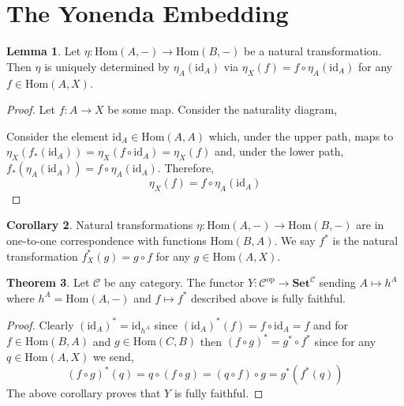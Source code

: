 \documentclass[12pt]{article}
\newcommand{\id}{\mathrm{id}}
\newcommand{\Hom}[2]{\mathrm{Hom}\left(#1, #2 \right)}
\newcommand{\C}{\mathcal{C}}
\newcommand{\Set}{\mathbf{Set}}
\newcommand{\op}{\mathrm{op}}
\theoremstyle{remark}
\theoremstyle{definition}
\newtheorem{theorem}{Theorem}[section]
\newtheorem{lemma}[theorem]{Lemma}
\newtheorem{corollary}[theorem]{Corollary}
\begin{document}
\section{The Yonenda Embedding}

\begin{lemma}
Let $\eta : \Hom{A}{-} \to \Hom{B}{-}$ be a natural transformation. Then $\eta$ is uniquely determined by $\eta_A(\id_A)$ via $\eta_X(f) = f \circ \eta_A(\id_A)$ for any $f \in \Hom{A}{X}$.  
\end{lemma}

\begin{proof}
Let $f : A \to X$ be some map.
Consider the naturality diagram,
\begin{center}
\end{center}
Consider the element $\id_A \in \Hom{A}{A}$ which, under the upper path, maps to $\eta_X (f_*(\id_A)) = \eta_X(f \circ \id_A) = \eta_X(f)$ and, under the lower path, $f_*(\eta_A(\id_A)) = f \circ \eta_A(\id_A)$. Therefore,
\[ \eta_X(f) = f \circ \eta_A(\id_A) \]
\end{proof}

\begin{corollary}
Natural transformations $\eta : \Hom{A}{-} \to \Hom{B}{-}$ are in one-to-one correspondence with functions $\Hom{B}{A}$. We say $f^*$ is the natural transformation $f^*_X(g) = g \circ f$ for any $g \in \Hom{A}{X}$.  
\end{corollary}

\begin{theorem}
Let $\C$ be any category. The functor $Y : \C^{\op} \to \Set^{\C}$ sending $A \mapsto h^A$ where $h^A = \Hom{A}{-}$ and $f \mapsto f^*$ described above is fully faithful.
\end{theorem}

\begin{proof}
Clearly $(\id_A)^* = \id_{h^A}$ since $(\id_A)^*(f) = f \circ \id_A = f$ and for $f \in \Hom{B}{A}$ and $g \in \Hom{C}{B}$ then $(f \circ g)^* = g^* \circ f^*$ since for any $q \in \Hom{A}{X}$ we send,
\[ (f \circ g)^*(q) = q \circ (f \circ g) = (q \circ f) \circ g = g^*(f^*(q)) \]
The above corollary proves that $Y$ is fully faithful.    
\end{proof}
\end{document}
